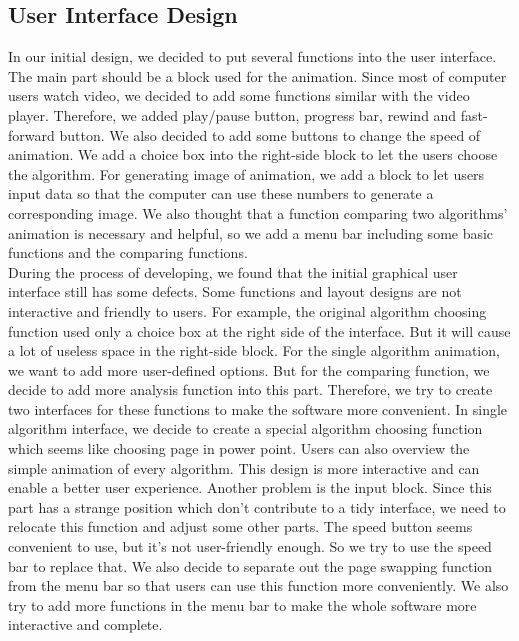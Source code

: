 \documentclass[paper=a4, fontsize=11pt,twoside]{scrartcl}		%
\begin{document}
\subsection{User Interface Design}

In our initial design, we decided to put several functions into the user interface. The main part should be a block used for the animation. Since most of computer users watch video, we decided to add some functions similar with the video player. Therefore, we added play/pause button, progress bar, rewind and fast-forward button. We also decided to add some buttons to change the speed of animation. We add a choice box into the right-side block to let the users choose the algorithm. For generating image of animation, we add a block to let users input data so that the computer can use these numbers to generate a corresponding image. We also thought that a function comparing two algorithms’ animation is necessary and helpful, so we add a menu bar including some basic functions and the comparing functions. \\
During the process of developing, we found that the initial graphical user interface still has some defects. Some functions and layout designs are not interactive and friendly to users. For example, the original algorithm choosing function used only a choice box at the right side of the interface. But it will cause a lot of useless space in the right-side block. For the single algorithm animation, we want to add more user-defined options. But for the comparing function, we decide to add more analysis function into this part. Therefore, we try to create two interfaces for these functions to make the software more convenient. In single algorithm interface, we decide to create a special algorithm choosing function which seems like choosing page in power point. Users can also overview the simple animation of every algorithm. This design is more interactive and can enable a better user experience. Another problem is the input block. Since this part has a strange position which don’t contribute to a tidy interface, we need to relocate this function and adjust some other parts. The speed button seems convenient to use, but it’s not user-friendly enough. So we try to use the speed bar to replace that. We also decide to separate out the page swapping function from the menu bar so that users can use this function more conveniently. We also try to add more functions in the menu bar to make the whole software more interactive and complete.
\end{document}
